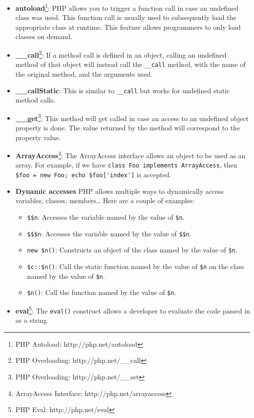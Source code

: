 \documentclass[a4paper]{article}
\begin{document}
\begin{itemize}
  \item \textbf{autoload}\footnote{PHP Autoload: http://php.net/autoload}:
    PHP allows you to trigger a function call in case an undefined class was
    used.  This function call is usually used to subsequently load the
    appropriate class at runtime. This feature allows programmers to only load
    classes on demand.
  \item \textbf{\_\_call}\footnote{PHP Overloading: http://php.net/\_\_call}:
    If a method call is defined in an object, calling an undefined method of
    that object will instead call the \verb&__call& method, with the name of
    the original method, and the arguments used.
  \item \textbf{\_\_callStatic}:
    This is similar to \verb&__call& but works for undefined static method
    calls.
  \item \textbf{\_\_get}\footnote{PHP Overloading: http://php.net/\_\_set}:
    This method will get called in case an access to an undefined object
    property is done. The value returned by the method will correspond to the
    property value.
  \item \textbf{ArrayAccess}\footnote{ArrayAccess Interface: http://php.net/arrayaccess}:
    The ArrayAccess interface allows an object to be used as an array. For
    example, if we have \verb&class Foo implements ArrayAccess&, then
    \verb&$foo = new Foo; echo $foo['index']& is accepted.
  \item \textbf{Dynamic accesses}
    PHP allows multiple ways to dynamically access variables, classes, members\ldots
    Here are a couple of examples:
    \begin{itemize}
      \item \verb/$$n/:
        Accesses the variable named by the value of \verb/$n/.
      \item \verb/$$$n/:
        Accesses the variable named by the value of \verb/$$n/.
      \item \verb/new $n()/:
        Constructs an object of the class named by the value of \verb/$n/.
      \item \verb/$c::$n()/:
        Call the static function named by the value of \verb/$n/ on the class
        named by the value of \verb/$n/.
      \item \verb/$n()/:
        Call the function named by the value of \verb/$n/.
    \end{itemize}
  \item \textbf{eval}\footnote{PHP Eval: http://php.net/eval}:
    The \verb&eval()& construct allows a developer to evaluate the code passed
    in as a string.
\end{itemize}
\end{document}
